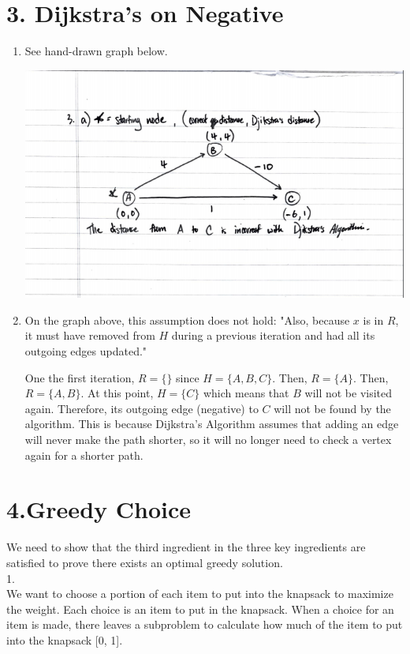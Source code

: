 \documentclass[11pt]{article}
\newenvironment{qparts}{\begin{enumerate}[{(}a{)}]}{\end{enumerate}}
\begin{document}
\newpage
\section*{3. Dijkstra's on Negative}
\begin{qparts}


\item 

See hand-drawn graph below. 

\includegraphics[scale=0.5]{hw7_q3a}

\item 
On the graph above, this assumption does not hold: "Also, because $x $ is in $R$, it must have removed from $H$ during a previous iteration and had all its outgoing edges updated." 

One the first iteration, $R=\{\}$ since $H = \{A, B, C\}$. Then, $R=\{A\}$. Then, $R=\{A, B\}$. At this point, $H = \{C\}$ which means that $B$ will not be visited again. Therefore, its outgoing edge (negative) to $C$ will not be found by the algorithm. This is because Dijkstra's Algorithm assumes that adding an edge will never make the path shorter, so it will no longer need to check a vertex again for a shorter path.  


\end{qparts}

\newpage
\section*{4.Greedy Choice}

We need to show that the third ingredient in the three key ingredients are satisfied to prove there exists an optimal greedy solution.\\

1. \\
We want to choose a portion of each item to put into the knapsack to maximize the weight. Each choice is an item to put in the knapsack. When a choice for an item is made, there leaves a subproblem to calculate how much of the item to put into the knapsack [0, 1]. \\
\end{document}
